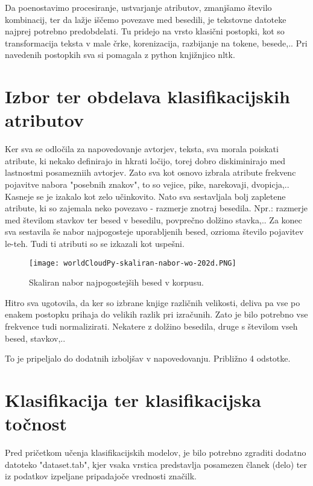 \documentclass[a4paper,11pt]{article}
\begin{document}
Da poenostavimo procesiranje, ustvarjanje atributov, zmanjšamo število kombinacij, ter da lažje iščemo povezave 
med besedili, je tekstovne datoteke najprej potrebno predobdelati. Tu pridejo na vrsto klasični postopki, kot so transformacija 
teksta v male črke, korenizacija, razbijanje na tokene, besede,.. Pri navedenih postopkih sva si pomagala z python knjižnjico nltk.

\section{Izbor ter obdelava klasifikacijskih atributov}

Ker sva se odločila za napovedovanje avtorjev, teksta, sva morala poiskati atribute, ki nekako definirajo in hkrati ločijo, 
torej dobro diskiminirajo med lastnostmi posamezniih avtorjev. Zato sva kot osnovo izbrala atribute frekvenc pojavitve 
nabora "posebnih znakov", to so vejice, pike, narekovaji, dvopicja,.. Kasneje se je izakalo kot zelo učinkovito. Nato 
sva sestavljala bolj zapletene atribute, ki so zajemala neko povezavo - razmerje znotraj besedila. Npr.: razmerje med
 številom stavkov ter besed v besedilu, povprečno dolžino stavka,.. Za konec sva sestavila še nabor najpogosteje uporabljenih besed, 
ozrioma število pojavitev le-teh. Tudi ti atributi so se izkazali kot uspešni. 

\begin{figure}[H]
\begin{center}
\centering
\texttt{[image: worldCloudPy-skaliran-nabor-wo-202d.PNG]}
\caption{Skaliran nabor najpogostejših besed v korpusu.}
\label{slika1}
\end{center}
\end{figure}


Hitro sva ugotovila, da ker so izbrane knjige različnih velikosti, deliva pa vse po enakem postopku prihaja do velikih razlik pri izračunih.
Zato je bilo potrebno vse frekvence tudi normalizirati. Nekatere z dolžino besedila, druge s številom vseh besed, stavkov,..

To je pripeljalo do dodatnih izboljšav v napovedovanju. Približno 4 odstotke.

\section{Klasifikacija ter klasifikacijska točnost}

Pred pričetkom učenja klasifikacijskih modelov, je bilo potrebno zgraditi dodatno datoteko "dataset.tab", kjer vsaka 
vrstica predstavlja posamezen članek (delo) ter iz podatkov izpeljane pripadajoče vrednosti značilk.
\end{document}

